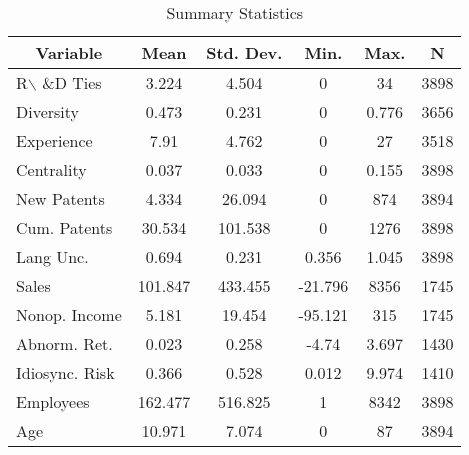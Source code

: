 
\begin{table}[htbp]\centering \caption{Summary Statistics \label{sumstat}}
\begin{tabular}{l c c c c c}\hline\hline
\multicolumn{1}{c}{\textbf{Variable}} & \textbf{Mean}
 & \textbf{Std. Dev.}& \textbf{Min.} &  \textbf{Max.} & \textbf{N}\\ \hline
R$\backslash$ \&D Ties & 3.224 & 4.504 & 0 & 34 & 3898\\
Diversity & 0.473 & 0.231 & 0 & 0.776 & 3656\\
Experience & 7.91 & 4.762 & 0 & 27 & 3518\\
Centrality & 0.037 & 0.033 & 0 & 0.155 & 3898\\
New Patents & 4.334 & 26.094 & 0 & 874 & 3894\\
Cum. Patents & 30.534 & 101.538 & 0 & 1276 & 3898\\
Lang Unc. & 0.694 & 0.231 & 0.356 & 1.045 & 3898\\
Sales & 101.847 & 433.455 & -21.796 & 8356 & 1745\\
Nonop. Income & 5.181 & 19.454 & -95.121 & 315 & 1745\\
Abnorm. Ret. & 0.023 & 0.258 & -4.74 & 3.697 & 1430\\
Idiosync. Risk & 0.366 & 0.528 & 0.012 & 9.974 & 1410\\
Employees & 162.477 & 516.825 & 1 & 8342 & 3898\\
Age & 10.971 & 7.074 & 0 & 87 & 3894\\
\hline\end{tabular}
\end{table}
